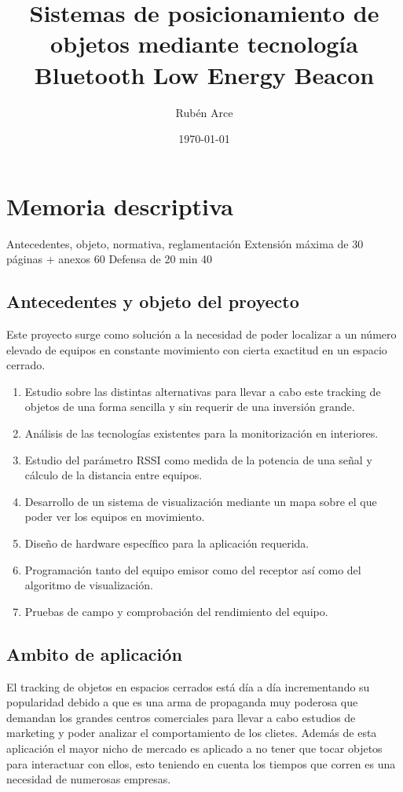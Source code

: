 \documentclass[a4paper ,12pt, onecolumn]{article}
\begin{document}
\title{Sistemas de posicionamiento de objetos mediante tecnología Bluetooth Low Energy
Beacon }
\author{Rubén Arce}
\date{\today}
\maketitle
\cleardoublepage
\tableofcontents
\cleardoublepage
\section{Memoria descriptiva}
Antecedentes, objeto, normativa, reglamentación
Extensión máxima de 30 páginas + anexos 60
Defensa de 20 min  40
    \subsection{Antecedentes y objeto del proyecto}
        Este proyecto surge como solución a la necesidad de poder localizar a un número elevado de equipos en 
        constante movimiento con cierta exactitud en un espacio cerrado.
        \begin{enumerate}
            \item Estudio sobre las distintas alternativas para llevar a cabo este tracking de objetos de una forma
            sencilla y sin requerir de una inversión grande.
            \item Análisis de las tecnologías existentes para la monitorización en interiores.
            \item Estudio del parámetro RSSI como medida de la potencia de una señal y cálculo de la distancia entre equipos.
            \item Desarrollo de un sistema de visualización mediante un mapa sobre el que poder ver los equipos en movimiento.
            \item Diseño de hardware específico para la aplicación requerida.
            \item Programación tanto del equipo emisor como del receptor así como del algoritmo de visualización.
            \item Pruebas de campo y comprobación del rendimiento del equipo.
        \end{enumerate}
    \subsection{Ambito de aplicación}
        El tracking de objetos en espacios cerrados está día a día incrementando su popularidad debido a que es una 
        arma de propaganda muy poderosa que demandan los grandes centros comerciales para llevar a cabo estudios de marketing
        y poder analizar el comportamiento de los clietes.
        Además de esta aplicación el mayor nicho de mercado es aplicado a no tener que tocar objetos para interactuar con ellos, 
        esto teniendo en cuenta los tiempos que corren es una necesidad de numerosas empresas.
\end{document}
